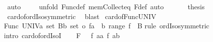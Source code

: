 \begin{isabellebody}
\ auto\isanewline
\ \ \ \ \isamarkupfalse%
{\isacharparenleft}{\kern0pt}unfold\ Func{\isacharunderscore}{\kern0pt}def\ mem{\isacharunderscore}{\kern0pt}Collect{\isacharunderscore}{\kern0pt}eq\ F{\isacharunderscore}{\kern0pt}def{\isacharcomma}{\kern0pt}\ auto{\isacharparenright}{\kern0pt}\isanewline
\ \ \isamarkupfalse%
\isanewline
\ \ \isamarkupfalse%
\ {\isacharquery}{\kern0pt}thesis\ \isamarkupfalse%
\ card{\isacharunderscore}{\kern0pt}of{\isacharunderscore}{\kern0pt}ordIso{\isacharbrackleft}{\kern0pt}symmetric{\isacharbrackright}{\kern0pt}\ \isamarkupfalse%
\ blast\isanewline
{}\isamarkupfalse%
%
\endisatagproof
{\isafoldproof}%
%
\isadelimproof
\isanewline
%
\endisadelimproof
\isanewline
{}\isamarkupfalse%
\ card{\isacharunderscore}{\kern0pt}of{\isacharunderscore}{\kern0pt}Func{\isacharunderscore}{\kern0pt}UNIV{\isacharcolon}{\kern0pt}\isanewline
{\isachardoublequoteopen}{\isacharbar}{\kern0pt}Func\ {\isacharparenleft}{\kern0pt}UNIV{\isacharcolon}{\kern0pt}{\isacharcolon}{\kern0pt}{\isacharprime}{\kern0pt}a\ set{\isacharparenright}{\kern0pt}\ {\isacharparenleft}{\kern0pt}B{\isacharcolon}{\kern0pt}{\isacharcolon}{\kern0pt}{\isacharprime}{\kern0pt}b\ set{\isacharparenright}{\kern0pt}{\isacharbar}{\kern0pt}\ {\isacharequal}{\kern0pt}o\ {\isacharbar}{\kern0pt}{\isacharbraceleft}{\kern0pt}f{\isacharcolon}{\kern0pt}{\isacharcolon}{\kern0pt}{\isacharprime}{\kern0pt}a\ {\isasymRightarrow}\ {\isacharprime}{\kern0pt}b{\isachardot}{\kern0pt}\ range\ f\ {\isasymsubseteq}\ B{\isacharbraceright}{\kern0pt}{\isacharbar}{\kern0pt}{\isachardoublequoteclose}\isanewline
%
\isadelimproof
%
\endisadelimproof
%
\isatagproof
{}\isamarkupfalse%
{\isacharparenleft}{\kern0pt}rule\ ordIso{\isacharunderscore}{\kern0pt}symmetric{\isacharparenright}{\kern0pt}\ \isamarkupfalse%
{\isacharparenleft}{\kern0pt}intro\ card{\isacharunderscore}{\kern0pt}of{\isacharunderscore}{\kern0pt}ordIsoI{\isacharparenright}{\kern0pt}\isanewline
\ \ \isamarkupfalse%
\ {\isacharquery}{\kern0pt}F\ {\isacharequal}{\kern0pt}\ {\isachardoublequoteopen}{\isasymlambda}\ f\ {\isacharparenleft}{\kern0pt}a{\isacharcolon}{\kern0pt}{\isacharcolon}{\kern0pt}{\isacharprime}{\kern0pt}a{\isacharparenright}{\kern0pt}{\isachardot}{\kern0pt}\ {\isacharparenleft}{\kern0pt}{\isacharparenleft}{\kern0pt}f\ a{\isacharparenright}{\kern0pt}{\isacharcolon}{\kern0pt}{\isacharcolon}{\kern0pt}{\isacharprime}{\kern0pt}b{\isacharparenright}{\kern0pt}{\isachardoublequoteclose}\isanewline

\end{isabellebody}
